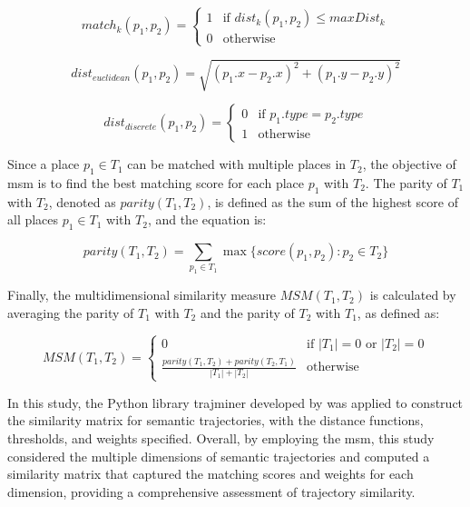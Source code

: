 \documentclass{article}
\theoremstyle{remark}
\begin{document}
\begin{equation} \label{eq:match}
    match_{k}(p_{1},p_{2}) = \begin{cases}
    1 & \text{if } dist_{k}(p_{1},p_{2}) \leq maxDist_{k}  \\
    0 & \text{otherwise}
    \end{cases}
\end{equation}

\begin{equation} \label{eq:dist_euclidean}
    dist_{euclidean}(p_{1},p_{2}) = \sqrt{(p_{1}.x-p_{2}.x)^2+(p_{1}.y-p_{2}.y)^2}
\end{equation}

\begin{equation} \label{eq:dist_discrete}
    dist_{discrete}(p_{1},p_{2}) = \begin{cases}
    0 & \text{if } p_{1}.type = p_{2}.type  \\
    1 & \text{otherwise}
    \end{cases}
\end{equation}

Since a place $p_{1} \in T_{1}$ can be matched with multiple places in $T_{2}$, the objective of \acrshort{msm} is to find the best matching score for each place $p_{1}$ with $T_{2}$. The parity of $T_{1}$ with $T_{2}$, denoted as $parity(T_{1},T_{2})$, is defined as the sum of the highest score of all places $p_{1} \in T_{1}$ with $T_{2}$, and the equation is:

\begin{equation} \label{eq:parity}
    parity(T_{1},T_{2}) = \sum_{p_{1}\in T_{1}}\max\{score(p_{1},p_{2}) : p_{2} \in T_{2}\}
\end{equation}

Finally, the multidimensional similarity measure $MSM(T_{1},T_{2})$ is calculated by averaging the parity of $T_{1}$ with $T_{2}$ and the parity of $T_{2}$ with $T_{1}$, as defined as:

\begin{equation} \label{eq:msm}
    MSM(T_{1},T_{2}) = \begin{cases}
    0 & \text{if } |T_{1}| = 0 \text{ or } |T_{2}| = 0 \\
    \frac{parity(T_{1},T_{2}) + parity(T_{2},T_{1})}{|T_{1}|+|T_{2}|} & \text{otherwise}
    \end{cases}
\end{equation}

In this study, the Python library trajminer developed by \cite{petry_trajminer_2019} was applied to construct the similarity matrix for semantic trajectories, with the distance functions, thresholds, and weights specified. Overall, by employing the \acrshort{msm}, this study considered the multiple dimensions of semantic trajectories and computed a similarity matrix that captured the matching scores and weights for each dimension, providing a comprehensive assessment of trajectory similarity.
\end{document}
